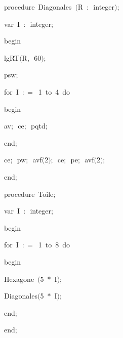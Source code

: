 {\pagebreak[3] 
\vspace{\neglskip}\mbox{\blc  \blk\idt  \mcl procedure\idt \ Diagonales\ $($R\ $:$\ integer$)$$;$}\par 
\pagebreak[3] 
\vspace{\neglskip}\mbox{\blc  \blk\blk\idt  \mcl var\idt \ I\ $:$\ integer$;$}\par 
\vspace{\neglskip}\mbox{\blc  \blk\idt  \mcl begin\idt }\par 
\vspace{\neglskip}\mbox{\blc  \blk\blk\idt  lgRT$($R$,$\ 60$)$$;$}\par 
\vspace{\neglskip}\mbox{\blc  \blk\blk\idt  psw$;$}\par 
\pagebreak[3] 
\vspace{\neglskip}\mbox{\blc  \blk\blk\idt  \mcl for\idt \ I\ $:$$=$\ 1\ \mcl to\idt \ 4\ \mcl do\idt }\par 
\vspace{\neglskip}\mbox{\blc  \blk\blk\blk\idt  \mcl begin\idt }\par 
\vspace{\neglskip}\mbox{\blc  \blk\blk\blk\blk\idt  av$;$\ ce$;$\ pqtd$;$}\par 
\vspace{\neglskip}\mbox{\blc  \blk\blk\blk\idt  \mcl end\idt $;$}\par 
\vspace{\neglskip}\mbox{\blc  \blk\blk\idt  ce$;$\ pw$;$\ avf$($2$)$$;$\ ce$;$\ pe$;$\ avf$($2$)$$;$\ }\par 
\vspace{\neglskip}\mbox{\blc  \blk\idt  \mcl end\idt $;$}\par 
\medskip

\pagebreak[3] 
\vspace{\neglskip}\mbox{\blc  \blk\idt  \mcl procedure\idt \ Toile$;$}\par 
\pagebreak[3] 
\vspace{\neglskip}\mbox{\blc  \blk\blk\idt  \mcl var\idt \ I\ $:$\ integer$;$}\par 
\vspace{\neglskip}\mbox{\blc  \blk\idt  \mcl begin\idt }\par 
\pagebreak[3] 
\vspace{\neglskip}\mbox{\blc  \blk\blk\idt  \mcl for\idt \ I\ $:$$=$\ 1\ \mcl to\idt \ 8\ \mcl do\idt }\par 
\vspace{\neglskip}\mbox{\blc  \blk\blk\blk\idt  \mcl begin\idt }\par 
\vspace{\neglskip}\mbox{\blc  \blk\blk\blk\blk\idt  Hexagone\ $($5\ $\ast$\ I$)$$;$}\par 
\vspace{\neglskip}\mbox{\blc  \blk\blk\blk\blk\idt  Diagonales$($5\ $\ast$\ I$)$$;$}\par 
\vspace{\neglskip}\mbox{\blc  \blk\blk\blk\idt  \mcl end\idt $;$}\par 
\vspace{\neglskip}\mbox{\blc  \blk\idt  \mcl end\idt $;$\ }\par 
\medskip

}

